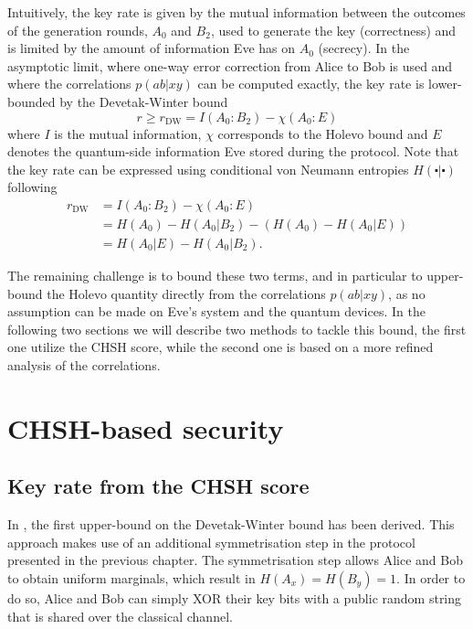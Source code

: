 Intuitively, the key rate is given by the mutual information between the outcomes of the generation rounds, $A_0$ and $B_2$, used to generate the key (correctness) and is limited by the amount of information Eve has on $A_0$ (secrecy).
In the asymptotic limit, where one-way error correction from Alice to Bob is used and where the correlations $p(ab|xy)$ can be computed exactly, the key rate is lower-bounded by the Devetak-Winter bound~\cite{Devetak2005}
\begin{equation}
	r \geq r_\mathrm{DW} = I(A_0 : B_2) - \chi(A_0 : E)
	\label{eq:Devetak-Winter}
\end{equation}
where $I$ is the mutual information, $\chi$ corresponds to the Holevo bound and $E$ denotes the quantum-side information Eve stored during the protocol.
Note that the key rate can be expressed using conditional von Neumann entropies $H(\centerdot|\centerdot)$ following
\begin{equation}
	\begin{split}
		r_\mathrm{DW} &= I(A_0 : B_2) - \chi(A_0 : E) \\
					  &= H(A_0)-H(A_0|B_2) - (H(A_0)- H(A_0|E)) \\
					  &= H(A_0|E) - H(A_0 | B_2).
	\end{split}
\end{equation}

The remaining challenge is to bound these two terms, and in particular to upper-bound the Holevo quantity directly from the correlations $p(ab|xy)$, as no assumption can be made on Eve's system and the quantum devices. 
In the following two sections we will describe two methods to tackle this bound, the first one utilize the CHSH score, while the second one is based on a more refined analysis of the correlations.

\section{CHSH-based security}

\subsection{Key rate from the CHSH score}
\label{sec:pironio}

In \cite{Pironio2009}, the first upper-bound on the Devetak-Winter bound has been derived.
This approach makes use of an additional symmetrisation step in the protocol presented in the previous chapter.
The symmetrisation step allows Alice and Bob to obtain uniform marginals, which result in $H(A_x)=H(B_y)=1$.
In order to do so, Alice and Bob can simply XOR their key bits with a public random string that is shared over the classical channel.

